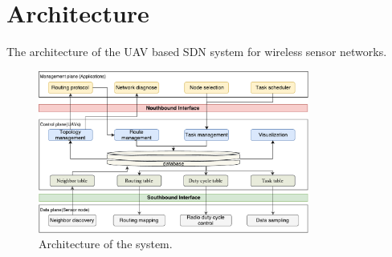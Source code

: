 \section{Architecture}

The architecture of the UAV based SDN system for wireless sensor networks.

\begin{figure}[htbp]
	\centering
	\includegraphics[width=3.5in]{./Figure/Architecture}
	\caption{Architecture of the system.}
	\label{Architecture}
\end{figure}



